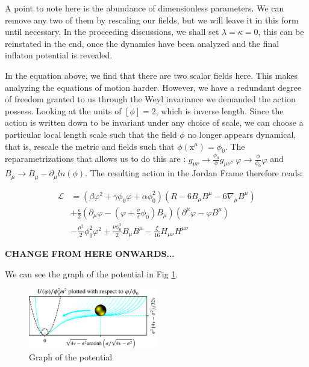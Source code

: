 \documentclass[aps,prd,reprint,preprintnumbers,showpacs,floatfix,nofootinbib,superscript address]{revtex4-2}
\begin{document}
A point to note here is the abundance of dimensionless parameters. We can remove any two of them by rescaling our fields, but we will leave it in this form until necessary. In the proceeding discussions, we shall set $\lambda = \kappa = 0$, this can be reinstated in the end, once the dynamics have been analyzed and the final inflaton potential is revealed.

In the equation above, we find that there are two scalar fields here. This makes analyzing the equations of motion harder. However, we have a redundant degree of freedom granted to us through the Weyl invariance we demanded the action possess. Looking at the units of $[\phi] = 2$, which is inverse length. Since the action is written down to be invariant under any choice of scale, we can choose a particular local length scale such that the field $\phi$ no longer appears dynamical, that is, rescale the metric and fields such that $\phi(\text{x}^\mu) = \phi_0$. The reparametrizations that allows us to do this are : $g_{\mu \nu} \rightarrow \frac{\phi_0}{\phi} g_{\mu \nu}$, $\varphi \rightarrow \frac{\phi}{\phi_0} \varphi$ and $B_{\mu} \rightarrow B_{\mu} - \partial_{\mu} ln(\phi)$. The resulting action in the Jordan Frame therefore reads:

\begin{equation}
    \begin{aligned}
        \mathcal{L} &= ( \beta \varphi^2 + \gamma \phi_0 \varphi +\alpha \phi^2_0) (R - 6B_{\mu} B^{\mu} - 6\nabla_\mu B^\mu) \\
        &+ \frac{\epsilon}{2} (\partial_\mu \varphi - (\varphi + \frac{\sigma}{\epsilon} \phi_0)B_\mu)(\partial^\mu \varphi - \varphi B^\mu)\\
        &- \frac{\mu^2}{2} \phi^2_0 \varphi^2 + \frac{\nu \phi_{0}^{2}}{2} B_\mu B^\mu - \frac{\xi}{16} H_{\mu\nu}H^{\mu\nu}
    \end{aligned}
\end{equation}


\textbf{CHANGE FROM HERE ONWARDS...}




We can see the graph of the potential in Fig \ref{Potential from Paper}.
\begin{figure}[h]
    \centering
    \includegraphics[width=0.5\textwidth]{Potential from Paper.png}
    \caption{Graph of the potential \cite{barker2024poincaregaugetheoryconformal}}
    \label{Potential from Paper}
\end{figure}
\end{document}
